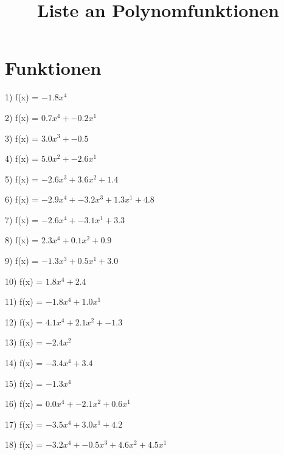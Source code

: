 \documentclass[10pt,a4paper]{article}
\begin{document}
\title{Liste an Polynomfunktionen}

\makeatletter
\def\@maketitle{%
  \newpage
  \null
  \vskip 2em%
  \begin{center}%
  \let \footnote \thanks
    {\Huge\bfseries\@title \par}%
    \vskip 1.5em%
    {\large
      \lineskip .5em%
      \begin{tabular}[t]{c}%
        \@author
      \end{tabular}\par}%
    \vskip 1em%
    {\large \@date}%
  \end{center}%
  \par
  \vskip 1.5em}
\makeatother

\author{}
\date{}

\maketitle

\setlength{\parindent}{0cm}

\section*{Funktionen}
1) f(x) = $-1.8x^4$

2) f(x) = $0.7x^4 + -0.2x^1$

3) f(x) = $3.0x^3 + -0.5$

4) f(x) = $5.0x^2 + -2.6x^1$

5) f(x) = $-2.6x^3 + 3.6x^2 + 1.4$

6) f(x) = $-2.9x^4 + -3.2x^3 + 1.3x^1 + 4.8$

7) f(x) = $-2.6x^4 + -3.1x^1 + 3.3$

8) f(x) = $2.3x^4 + 0.1x^2 + 0.9$

9) f(x) = $-1.3x^3 + 0.5x^1 + 3.0$

10) f(x) = $1.8x^4 + 2.4$

11) f(x) = $-1.8x^4 + 1.0x^1$

12) f(x) = $4.1x^4 + 2.1x^2 + -1.3$

13) f(x) = $-2.4x^2$

14) f(x) = $-3.4x^4 + 3.4$

15) f(x) = $-1.3x^4$

16) f(x) = $0.0x^4 + -2.1x^2 + 0.6x^1$

17) f(x) = $-3.5x^4 + 3.0x^1 + 4.2$

18) f(x) = $-3.2x^4 + -0.5x^3 + 4.6x^2 + 4.5x^1$
\end{document}
